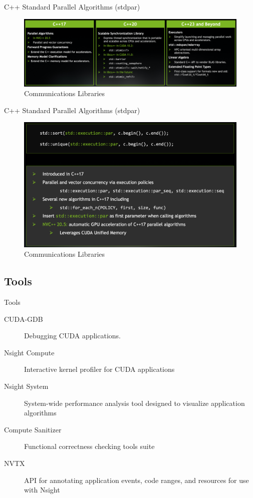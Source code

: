 \documentclass[aspectratio=169]{beamer}
\begin{document}
\begin{frame}{C++ Standard Parallel Algorithms (stdpar)}
\begin{figure}
  \includegraphics[width=\linewidth]{figures/cpp.png}
  \caption{Communications Libraries}
\end{figure}
\end{frame}

\begin{frame}{C++ Standard Parallel Algorithms (stdpar)}
\begin{figure}
  \includegraphics[height=0.75\textheight]{figures/cpp_1.png}
  \caption{Communications Libraries}
\end{figure}
\end{frame}

\subsection{Tools}

\begin{frame}{Tools}
\begin{description}
  \item[CUDA-GDB] Debugging CUDA applications.
  \item[Nsight Compute] Interactive kernel profiler for CUDA applications
  \item[Nsight System] System-wide performance analysis tool designed to visualize application algorithms
  \item[Compute Sanitizer] Functional correctness checking tools suite
  \item[NVTX] API for annotating application events, code ranges, and resources for use with Nsight
\end{description}
\end{frame}
\end{document}
